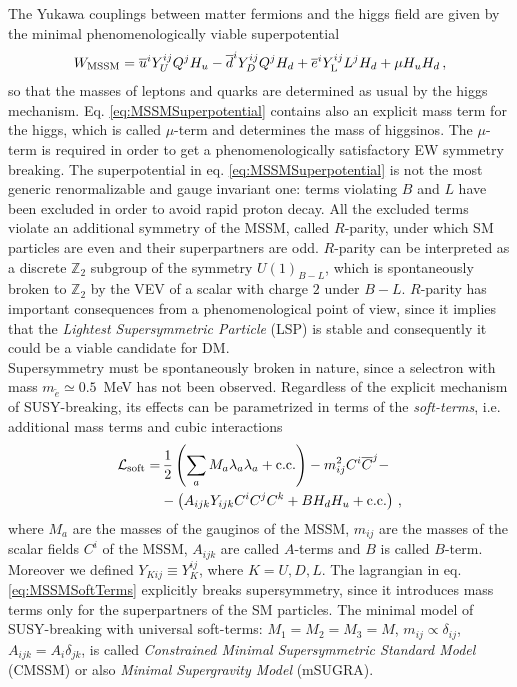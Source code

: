 \documentclass[12pt,a4paper]{book}
\begin{document}
The Yukawa couplings between matter fermions and the higgs field are given by the minimal phenomenologically viable superpotential
\begin{align}
\label{eq:MSSMSuperpotential}
W_{\rm MSSM} = \overline{u}^i Y^{ij}_U Q^j H_u - \overline{d}^i Y^{ij}_D Q^j H_d + \overline{e}^i Y^{ij}_{\rm L} L^j H_d + \mu H_u H_d \,,
\end{align}
so that the masses of leptons and quarks are determined as usual by the higgs mechanism. Eq. \eqref{eq:MSSMSuperpotential} contains also an explicit mass term for the higgs, which is called $\mu$-term and determines the mass of higgsinos. The $\mu$-term is required in order to get a phenomenologically satisfactory EW symmetry breaking. The superpotential in eq. \eqref{eq:MSSMSuperpotential} is not the most generic renormalizable and gauge invariant one: terms violating $B$ and $L$ have been excluded in order to avoid rapid proton decay. All the excluded terms violate an additional symmetry of the MSSM, called $R$-parity, under which SM particles are even and their superpartners are odd. $R$-parity can be interpreted as a discrete $\mathbb{Z}_2$ subgroup of the symmetry $U(1)_{B-L}$, which is spontaneously broken to $\mathbb{Z}_2$ by the VEV of a scalar with charge $2$ under $B-L$. $R$-parity has important consequences from a phenomenological point of view, since it implies that the \textit{Lightest Supersymmetric Particle} (LSP) is stable and consequently it could be a viable candidate for DM.\\


Supersymmetry must be spontaneously broken in nature, since a selectron with mass $m_{\tilde{e}} \simeq 0.5 \,$ MeV has not been observed. Regardless of the explicit mechanism of SUSY-breaking, its effects can be parametrized in terms of the \textit{soft-terms}, i.e. additional mass terms and cubic interactions~\cite{Chung:2003fi}
\begin{align}
\label{eq:MSSMSoftTerms}
\mathcal{L}_{\rm soft} =&\, \frac{1}{2} \left(\sum_a M_a \lambda_a \lambda_a + \text{c.c.}\right) - m_{ij}^2 C^i \overline{C}^j - \nonumber \\
& - \left(A_{ijk} Y_{ijk} C^i C^j C^k + B H_d H_u + \text{c.c.}\right) \,,
\end{align}
where $M_a$ are the masses of the gauginos of the MSSM, $m_{ij}$ are the masses of the scalar fields $C^i$ of the MSSM, $A_{ijk}$ are called $A$-terms and $B$ is called $B$-term. Moreover we defined $Y_{Kij} \equiv Y_K^{ij}$, where $K = U, D, L$. The lagrangian in eq. \eqref{eq:MSSMSoftTerms} explicitly breaks supersymmetry, since it introduces mass terms only for the superpartners of the SM particles. The minimal model of SUSY-breaking with universal soft-terms: $M_1 = M_2 = M_3 = M$, $m_{ij} \propto \delta_{ij}$, $A_{ijk} = A_i \delta_{jk}$, is called \textit{Constrained Minimal Supersymmetric Standard Model} (CMSSM) or also \textit{Minimal Supergravity Model} (mSUGRA).\\
\end{document}
